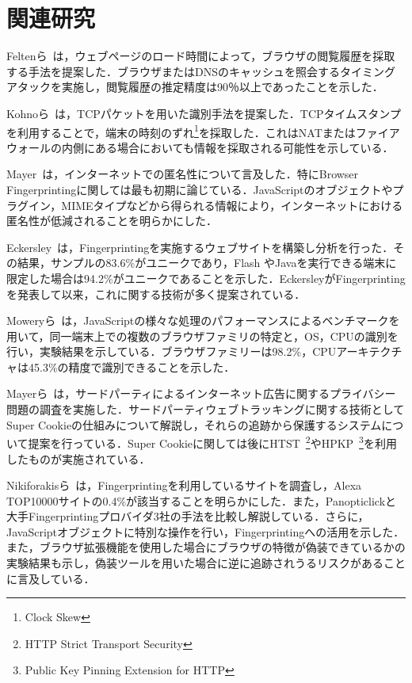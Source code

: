 \newpage
\section{関連研究}
Feltenら~\cite{felten2000timing}は，ウェブページのロード時間によって，ブラウザの閲覧履歴を採取する手法を提案した．ブラウザまたはDNSのキャッシュを照会するタイミングアタックを実施し，閲覧履歴の推定精度は90％以上であったことを示した．

Kohnoら~\cite{kohno2005remote}は，TCPパケットを用いた識別手法を提案した．TCPタイムスタンプを利用することで，端末の時刻のずれ\footnote{Clock Skew}を採取した．これはNATまたはファイアウォールの内側にある場合においても情報を採取される可能性を示している．

Mayer~\cite{mayer2009any}は，インターネットでの匿名性について言及した．特にBrowser Fingerprintingに関しては最も初期に論じている．JavaScriptのオブジェクトやプラグイン，MIMEタイプなどから得られる情報により，インターネットにおける匿名性が低減されることを明らかにした．

Eckersley~\cite{eckersley2010unique}は，Fingerprintingを実施するウェブサイトを構築し分析を行った．その結果，サンプルの83.6\%がユニークであり，Flash やJavaを実行できる端末に限定した場合は94.2\%がユニークであることを示した．EckersleyがFingerprintingを発表して以来，これに関する技術が多く提案されている．

Moweryら~\cite{mowery2011fingerprinting}は，JavaScriptの様々な処理のパフォーマンスによるベンチマークを用いて，同一端末上での複数のブラウザファミリの特定と，OS，CPUの識別を行い，実験結果を示している．ブラウザファミリーは98.2\%，CPUアーキテクチャは45.3\%の精度で識別できることを示した．

Mayerら~\cite{mayer2012third}は，サードパーティによるインターネット広告に関するプライバシー問題の調査を実施した．サードパーティウェブトラッキングに関する技術としてSuper Cookieの仕組みについて解説し，それらの追跡から保護するシステムについて提案を行っている．Super Cookieに関しては後にHTST~\footnote{HTTP Strict Transport Security}やHPKP~\footnote{Public Key Pinning Extension for HTTP}を利用したものが実施されている．

Nikiforakisら~\cite{nikiforakis2013cookieless}は，Fingerprintingを利用しているサイトを調査し，Alexa TOP10000サイトの0.4\%が該当することを明らかにした．また，Panopticlickと大手Fingerprintingプロバイダ3社の手法を比較し解説している．さらに，JavaScriptオブジェクトに特別な操作を行い，Fingerprintingへの活用を示した．また，ブラウザ拡張機能を使用した場合にブラウザの特徴が偽装できているかの実験結果も示し，偽装ツールを用いた場合に逆に追跡されうるリスクがあることに言及している．


